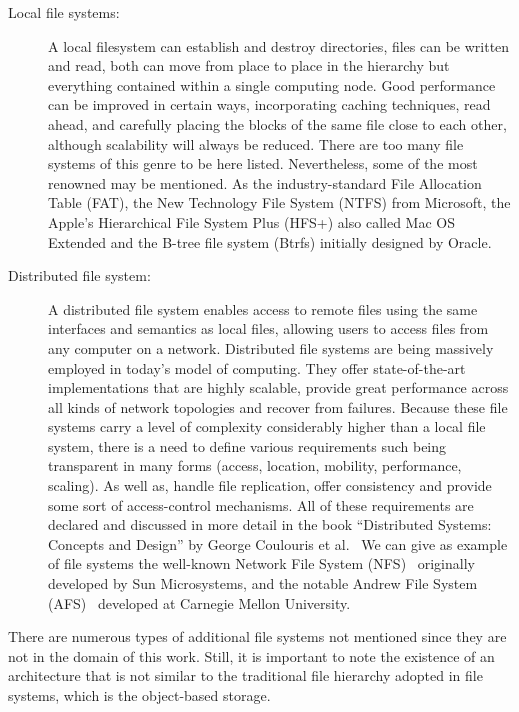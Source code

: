 \begin{description}
	\item [Local file systems:] A local filesystem can establish and destroy directories, files can be written and read, both can move from place to place in the hierarchy but everything contained within a single computing node. 
		Good performance can be improved in certain ways, incorporating caching techniques, read ahead, and carefully placing the blocks of the same file close to each other, although scalability will always be reduced. 
		There are too many file systems of this genre to be here listed. Nevertheless, some of the most renowned may be mentioned. As the industry-standard File Allocation Table (FAT), the New Technology File System (NTFS) from Microsoft, the Apple's Hierarchical File System Plus (HFS+) also called Mac OS Extended and the B-tree file system (Btrfs) initially designed by Oracle.
	\item [Distributed file system:] A distributed file system enables access to remote files using the same interfaces and semantics as local files, allowing users to access files from any computer on a network. 
		Distributed file systems are being massively employed in today's model of computing. They offer state-of-the-art implementations that are highly scalable, provide great performance across all kinds of network topologies and recover from failures. 
		Because these file systems carry a level of complexity considerably higher than a local file system, there is a need to define various requirements such being transparent in many forms (access, location, mobility, performance, scaling). As well as, handle file replication, offer consistency and provide some sort of access-control mechanisms. 
		All of these requirements are declared and discussed in more detail in the book \enquote{Distributed Systems: Concepts and Design} by George Coulouris et al.~\cite{Coulouris2011}
		We can give as example of file systems the well-known Network File System (NFS)~\cite{rfc5661} originally developed by Sun Microsystems, and the notable Andrew File System (AFS)~\cite{Satyanarayanan1990} developed at Carnegie Mellon University.
\end{description}

There are numerous types of additional file systems not mentioned since they are not in the domain of this work. Still, it is important to note the existence of an architecture that is not similar to the traditional file hierarchy adopted in file systems, which is the object-based storage. 

